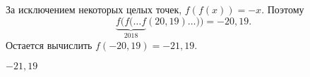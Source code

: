 \solutionSection
За исключением некоторых целых точек, $f(f(x))=-x$. 
Поэтому $$\underbrace{f(f(\ldots f}_{2018}(20,19)\ldots ))=-20,19.$$ 
Остается вычислить $f(-20,19)=-21,19$.
 
\answerMath
$-21,19$